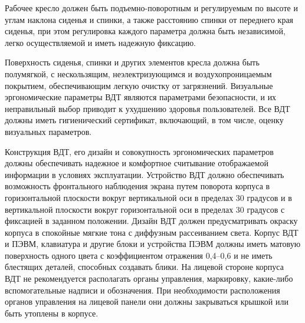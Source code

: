 Рабочее кресло должен быть подъемно-поворотным и регулируемым по высоте и углам наклона сиденья и спинки, а также расстоянию спинки от переднего края сиденья, при этом регулировка каждого параметра должна быть независимой, легко осуществляемой и иметь надежную фиксацию.

Поверхность сиденья, спинки и других элементов кресла должна быть полумягкой, с нескользящим, неэлектризующимся и воздухопроницаемым покрытием, обеспечивающим легкую очистку от загрязнений. 
Визуальные эргономические параметры ВДТ являются параметрами безопасности, и их неправильный выбор приводит к ухудшению здоровья пользователей. Все ВДТ должны иметь гигиенический сертификат, включающий, в том числе, оценку визуальных параметров. 

Конструкция ВДТ, его дизайн и совокупность эргономических параметров должны обеспечивать надежное и комфортное считывание отображаемой информации в условиях эксплуатации. Устройство ВДТ должно обеспечивать возможность фронтального наблюдения экрана путем поворота корпуса в горизонтальной плоскости вокруг вертикальной оси в пределах 30 градусов и в вертикальной плоскости вокруг горизонтальной оси в пределах 30 градусов с фиксацией в заданном положении. Дизайн ВДТ должен предусматривать окраску корпуса в спокойные мягкие тона с диффузным рассеиванием света. Корпус ВДТ и ПЭВМ, клавиатура и другие блоки и устройства ПЭВМ должны иметь матовую поверхность одного цвета с коэффициентом отражения 0,4--0,6 и не иметь блестящих деталей, способных создавать блики. На лицевой стороне корпуса ВДТ не рекомендуется располагать органы управления, маркировку, какие-либо вспомогательные надписи и обозначения. При необходимости расположения органов управления на лицевой панели они должны закрываться крышкой или быть утоплены в корпусе.

